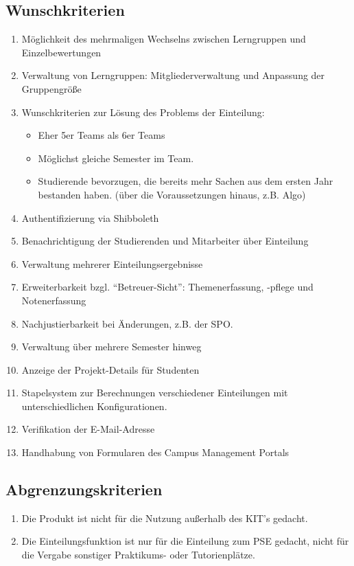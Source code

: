 \documentclass[parskip=full]{scrartcl}
\begin{document}
\subsection{Wunschkriterien}
\begin{enumerate}[{W}1]
    \item Möglichkeit des mehrmaligen Wechselns zwischen Lerngruppen und \\
    Einzelbewertungen
    \item Verwaltung von Lerngruppen: Mitgliederverwaltung und Anpassung der
    Gruppengröße
    \item Wunschkriterien zur Lösung des Problems der Einteilung:
    \begin{itemize}
        \item Eher 5er Teams als 6er Teams
        \item Möglichst gleiche Semester im Team.
        \item Studierende bevorzugen, die bereits mehr Sachen aus dem ersten Jahr
        bestanden haben. (über die Voraussetzungen hinaus, z.B. Algo)
    \end{itemize}    
    \item Authentifizierung via Shibboleth
    \item Benachrichtigung der Studierenden und Mitarbeiter über Einteilung
    \item Verwaltung mehrerer Einteilungsergebnisse
    \item Erweiterbarkeit bzgl. “Betreuer-Sicht”: Themenerfassung, -pflege und Notenerfassung
    \item Nachjustierbarkeit bei Änderungen, z.B. der SPO.
    \item Verwaltung über mehrere Semester hinweg
    \item Anzeige der Projekt-Details für Studenten
    \item Stapelsystem zur Berechnungen verschiedener Einteilungen mit unterschiedlichen Konfigurationen.
    \item Verifikation der E-Mail-Adresse
    \item Handhabung von Formularen des Campus Management Portals
    
    
    
\end{enumerate}

\subsection{Abgrenzungskriterien}
\begin{enumerate}[{A}1]
 
  \item Die Produkt ist nicht für die Nutzung außerhalb des KIT's gedacht.

\item Die Einteilungsfunktion ist nur für die Einteilung zum PSE gedacht, nicht
für die Vergabe sonstiger Praktikums- oder Tutorienplätze.
  
\end{enumerate}
\end{document}
